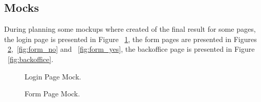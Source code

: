 \subsection{Mocks}
During planning some mockups where created of the final result for some pages, the login page is presented in Figure ~\ref{fig:login}, the form pages are presented in Figures ~\ref{fig:form},~\ref{fig:form_no} and ~\ref{fig:form_yes}, the backoffice page is presented in Figure ~\ref{fig:backoffice}.

\begin{figure}[H]
	\begin{center}
	\end{center}
	\caption{Login Page Mock.}\label{fig:login}
\end{figure}

\begin{figure}[H]
	\begin{center}
	\end{center}
	\caption{Form Page Mock.}\label{fig:form}
\end{figure}

